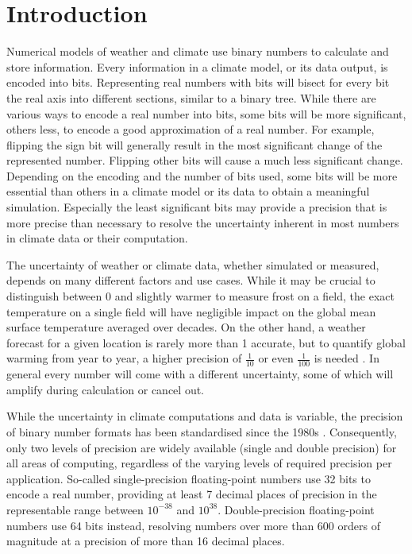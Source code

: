 \chapter{Introduction}
\label{chap:introduction}

Numerical models of weather and climate use binary numbers to calculate and store information.
Every information in a climate model, or its data output, is encoded into bits. Representing
real numbers with bits will bisect for every bit the real axis into different sections, similar to a binary tree.
While there are various ways to encode a real number into bits, some bits will be more significant, others
less, to encode a good approximation of a real number. For example, flipping the sign bit will
generally result in the most significant change of the represented number. Flipping other bits will
cause a much less significant change. Depending on the encoding and the number of bits used,
some bits will be more essential than others in a climate model or its data to obtain a meaningful
simulation. Especially the least significant bits may provide a precision that is more precise than
necessary to resolve the uncertainty inherent in most numbers in climate data or their computation.

The uncertainty of weather or climate data, whether simulated or measured, depends on many different
factors and use cases. While it may be crucial to distinguish between 0 and slightly warmer
to measure frost on a field, the exact temperature on a single field will have negligible impact on the
global mean surface temperature averaged over decades. On the other hand, a weather forecast for a
given location is rarely more than 1 accurate, but to quantify global warming from year to year,
a higher precision of $\tfrac{1}{10}$ or even $\tfrac{1}{100}$ is needed
\citep{Haustein2017}. In general every number will come with a different uncertainty, some of which will
amplify during calculation or cancel out.

While the uncertainty in climate computations and data is variable, the precision of binary number formats
has been standardised since the 1980s \citep{IEEE1985,IEEE2008}. Consequently, only two levels of precision
are widely available (single and double precision) for all areas of computing, regardless of the varying levels of
required precision per application. So-called single-precision floating-point numbers use 32 bits to encode a
real number, providing at least 7 decimal places of precision in the representable range between $10^{-38}$
and $10^{38}$. Double-precision floating-point numbers use 64 bits instead, resolving numbers over more
than 600 orders of magnitude at a precision of more than 16 decimal places. 

